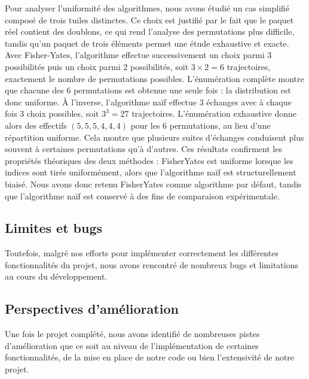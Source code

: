 \documentclass[11pt]{article}
\begin{document}
Pour analyser l’uniformité des algorithmes, nous avons étudié un cas simplifié composé de trois tuiles distinctes.
Ce choix est justifié par le fait que le paquet réel contient des doublons, ce qui rend l’analyse des permutations plus difficile, tandis qu’un paquet de trois éléments permet une étude exhaustive et exacte. 
Avec Fisher-Yates, l’algorithme effectue successivement un choix parmi 3 possibilités puis un choix parmi 2 possibilités, soit $3 \times 2 = 6$ trajectoires, exactement le nombre de permutations possibles. 
L’énumération complète montre que chacune des 6 permutations est obtenue une seule fois : la distribution est donc uniforme. 
À l’inverse, l’algorithme naïf effectue 3 échanges avec à chaque fois 3 choix possibles, soit $3^3 = 27$ trajectoires. 
L’énumération exhaustive donne alors des effectifs $(5,5,5,4,4,4)$ pour les 6 permutations, au lieu d’une répartition uniforme. 
Cela montre que plusieurs suites d’échanges conduisent plus souvent à certaines permutations qu’à d’autres.
Ces résultats confirment les propriétés théoriques des deux méthodes : Fisher\-Yates est uniforme lorsque les indices sont tirés uniformément, alors que l’algorithme naïf est structurellement biaisé. 
Nous avons donc retenu Fisher\-Yates comme algorithme par défaut, tandis que l’algorithme naïf est conservé à des fins de comparaison expérimentale.


\subsection{Limites et bugs}

Toutefois, malgré nos efforts pour implémenter correctement les différentes fonctionnalités du projet, nous avons rencontré de nombreux bugs et limitations au cours du développement.


\subsection{Perspectives d’amélioration}

Une fois le projet complété, nous avons identifié de nombreuses pistes d’amélioration que ce soit au niveau de l'implémentation de certaines fonctionnalités, de la mise en place de notre code ou bien l'extensivité de notre projet.
\end{document}
